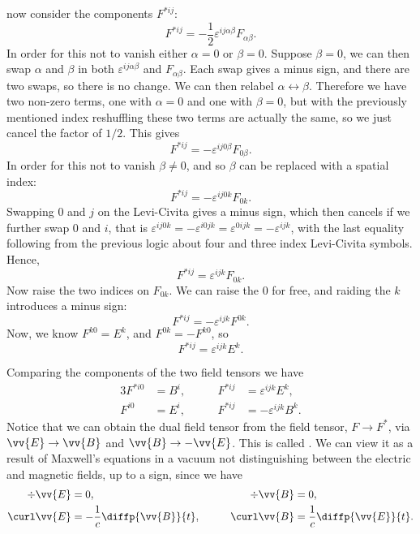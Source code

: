 now consider the components \(F^{*ij}\):
\begin{equation}
    F^{*ij} = -\frac{1}{2}\varepsilon^{ij\alpha\beta}F_{\alpha\beta}.
\end{equation}
In order for this not to vanish either \(\alpha = 0\) or \(\beta = 0\).
Suppose \(\beta = 0\), we can then swap \(\alpha\) and \(\beta\) in both \(\varepsilon^{ij\alpha\beta}\) and \(F_{\alpha\beta}\).
Each swap gives a minus sign, and there are two swaps, so there is no change.
We can then relabel \(\alpha \leftrightarrow \beta\).
Therefore we have two non-zero terms, one with \(\alpha = 0\) and one with \(\beta = 0\), but with the previously mentioned index reshuffling these two terms are actually the same, so we just cancel the factor of \(1/2\).
This gives
\begin{equation}
    F^{*ij} = -\varepsilon^{ij0\beta}F_{0\beta}.
\end{equation}
In order for this not to vanish \(\beta \ne 0\), and so \(\beta\) can be replaced with a spatial index:
\begin{equation}
    F^{*ij} = -\varepsilon^{ij0k}F_{0k}.
\end{equation}
Swapping \(0\) and \(j\) on the Levi-Civita gives a minus sign, which then cancels if we further swap \(0\) and \(i\), that is \(\varepsilon^{ij0k} = -\varepsilon^{i0jk} = \varepsilon^{0ijk} = -\varepsilon^{ijk}\), with the last equality following from the previous logic about four and three index Levi-Civita symbols.
Hence,
\begin{equation}
    F^{*ij} = \varepsilon^{ijk}F_{0k}.
\end{equation}
Now raise the two indices on \(F_{0k}\).
We can raise the \(0\) for free, and raiding the \(k\) introduces a minus sign:
\begin{equation}
    F^{*ij} = -\varepsilon^{ijk}F^{0k}.
\end{equation}
Now, we know \(F^{k0} = E^k\), and \(F^{0k} = -F^{k0}\), so
\begin{equation}
    F^{*ij} = \varepsilon^{ijk}E^k.
\end{equation}

Comparing the components of the two field tensors we have
\begin{alignat}{3}
    F^{*i0} &= B^i, \qquad  & F^{*ij} &= \varepsilon^{ijk}E^k,\\
    F^{i0} &= E^i, \qquad & F^{*ij} &= -\varepsilon^{ijk}B^k.
\end{alignat}
Notice that we can obtain the dual field tensor from the field tensor, \(F \to F^*\), via \(\vv{E} \to \vv{B}\) and \(\vv{B} \to -\vv{E}\).
This is called .
We can view it as a result of Maxwell's equations in a vacuum not distinguishing between the electric and magnetic fields, up to a sign, since we have
\begin{alignat}{3}
    \div\vv{E} &= 0, \qquad & \div\vv{B} &= 0,\\
    \curl\vv{E} &= -\frac{1}{c}\diffp{\vv{B}}{t}, \qquad & \curl\vv{B} &= \frac{1}{c}\diffp{\vv{E}}{t}.
\end{alignat}


